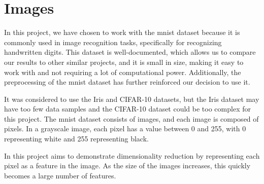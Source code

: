 \section{Images}\label{sec:images}


In this project, we have chosen to work with the \gls{mnist} dataset because it is commonly used in image recognition tasks, specifically for recognizing handwritten digits. This dataset is well-documented, which allows us to compare our results to other similar projects, and it is small in size, making it easy to work with and not requiring a lot of computational power\cite{lecun-mnist-database}. Additionally, the preprocessing of the \gls{mnist} dataset has further reinforced our decision to use it.

It was considered to use the Iris and CIFAR-10 datasets, but the Iris dataset may have too few data samples \cite{mnist-vs-iris} and the CIFAR-10 dataset could be too complex for this project\cite{datasets-uniqtech}. The \gls{mnist} dataset consists of images, and each image is composed of pixels. In a grayscale image, each pixel has a value between 0 and 255, with 0 representing white and 255 representing black.

In this project aims to demonstrate dimensionality reduction by representing each pixel as a feature in the image. As the size of the images increases, this quickly becomes a large number of features.